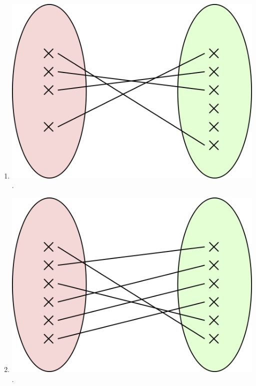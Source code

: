 \documentclass[a4paper,11pt]{article}
\begin{document}
\begin{multicols}{2}
\begin{enumerate}[\bfseries 1.]
				.\dotfill

	\item 	\includegraphics[width=\myw]{6.png}\\
	
				.\dotfill
	
	\item 	\includegraphics[width=\myw]{7.png}\\
	
				.\dotfill
		

\end{enumerate}
\end{multicols}
\end{document}
